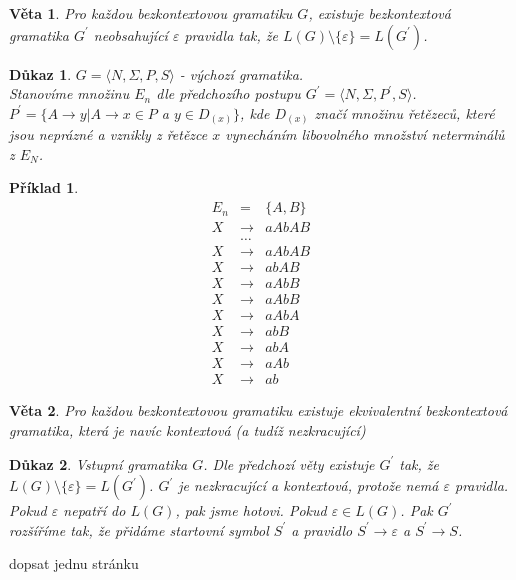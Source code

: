 \documentclass[10pt, a4paper, titlepage]{article}
\theoremstyle{note}
\newtheorem{veta}{\textbf{Věta}}
\newtheorem{dukaz}{\textbf{Důkaz}}
\newtheorem{priklad}{\textbf{Příklad}}
\begin{document}
\begin{veta}
Pro každou bezkontextovou gramatiku $G$, existuje bezkontextová gramatika $G^{'}$ neobsahující $\varepsilon$ pravidla tak, že $L(G) \setminus \lbrace \varepsilon \rbrace = L(G^{'})$.
\end{veta}

\begin{dukaz}
$G = \langle N, \Sigma, P,S \rangle$ - výchozí gramatika.\\
Stanovíme množinu $E_{n}$ dle předchozího postupu $G^{'} = \langle N, \Sigma, P^{'},S \rangle$.
$P^{'} = \lbrace A \rightarrow y|A \rightarrow x \in P$ a $y \in D_{(x)} \rbrace$, kde $D_{(x)}$ značí množinu řetězeců, které jsou neprázné 
a vznikly z řetězce $x$ vynecháním libovolného množství neterminálů z $E_{N}$.
\end{dukaz}

\begin{priklad}
\begin{eqnarray*}
E_{n} &=& \lbrace A, B \rbrace \\
X &\rightarrow& aAbAB \\
&\ldots& \\
X &\rightarrow& aAbAB \\
X &\rightarrow& abAB \\
X &\rightarrow& aAbB \\
X &\rightarrow& aAbB \\
X &\rightarrow& aAbA \\
X &\rightarrow& abB \\
X &\rightarrow& abA \\
X &\rightarrow& aAb \\
X &\rightarrow& ab
\end{eqnarray*}
\end{priklad}

\begin{veta}
Pro každou bezkontextovou gramatiku existuje ekvivalentní bezkontextová gramatika, která je navíc kontextová (a tudíž nezkracující)
\end{veta}

\begin{dukaz}
Vstupní gramatika $G$. Dle předchozí věty existuje $G^{'}$ tak, že $L(G) \setminus \lbrace \varepsilon \rbrace = L(G^{'})$. 
$G^{'}$ je nezkracující a kontextová, protože nemá $\varepsilon$ pravidla. Pokud $\varepsilon$ nepatří do $L(G)$, pak jsme hotovi.
Pokud $\varepsilon \in L(G)$. Pak $G^{'}$ rozšíříme tak, že přidáme startovní symbol $S^{'}$ 
a pravidlo $S^{'} \rightarrow \varepsilon$ a $S^{'} \rightarrow S$.
\end{dukaz}
dopsat jednu stránku
\end{document}

